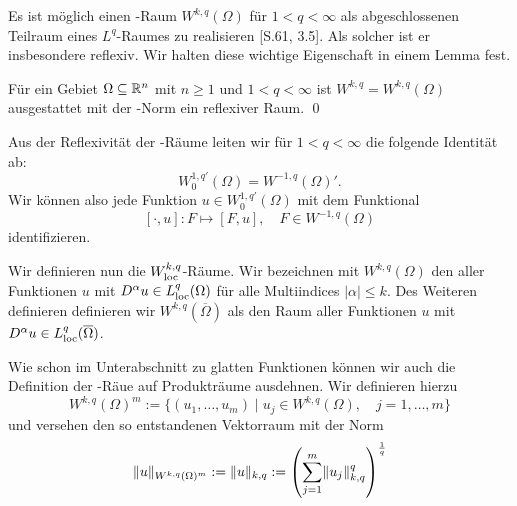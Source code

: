 Es ist möglich einen \sobolev\hyp{}Raum $W^{k,q}(\Omega)$ für $1 < q < \infty$ als abgeschlossenen Teilraum eines $L^q$\hyp{}Raumes zu realisieren \cite{adams2003sobolev}[S.61, 3.5].
Als solcher ist er insbesondere reflexiv.
Wir halten diese wichtige Eigenschaft in einem Lemma fest.

\begin{lem}
  Für ein Gebiet $\Omega \subseteq \mathbb{R}^n$ mit $n \geq 1$ und $1 < q < \infty$ ist $W^{k,q} = W^{k,q}(\Omega)$ ausgestattet mit der \sobolev\hyp{}Norm ein reflexiver Raum. \qed
\end{lem}

Aus der Reflexivität der \sobolev\hyp{}Räume leiten wir für $1 < q < \infty$ die folgende Identität ab:
$$
  W_0^{1,q'}(\Omega) = W^{-1,q}(\Omega)'.
$$
Wir können also jede Funktion $u \in W_0^{1,q'}(\Omega)$ mit dem Funktional
$$
[\cdot, u] \colon F \mapsto [F, u], \quad F \in W^{-1,q}(\Omega)
$$
identifizieren.

Wir definieren nun die $W^{k,q}_{\operatorname{loc}}$\hyp{}Räume.
Wir bezeichnen mit $W^{k,q}(\Omega)$ den aller Funktionen $u$ mit $D^\alpha u \in L^q_{\operatorname{loc}}(\Omega)$ für alle Multiindices $|\alpha| \leq k$.
Des Weiteren definieren definieren wir $W^{k,q}(\overline\Omega)$ als den Raum aller Funktionen $u$ mit $D^\alpha u \in L^q_{\operatorname{loc}}(\overline\Omega)$.

Wie schon im Unterabschnitt zu glatten Funktionen können wir auch die Definition der \sobolev\hyp{}Räue auf Produkträume ausdehnen. 
Wir definieren hierzu
$$
W^{k,q}(\Omega)^m := \{ (u_1,\dots,u_m) \mid u_j \in W^{k,q}(\Omega), \quad j = 1,\dots, m\}
$$
und versehen den so entstandenen Vektorraum mit der Norm
$$
\lVert u \rVert_{W^{k,q}(\Omega)^m} 
:= \lVert u \rVert_{k,q}
:= \left( \sum_{j = 1}^m \lVert u_j \rVert_{k,q}^q \right)^{\frac{1}{q}}
$$

